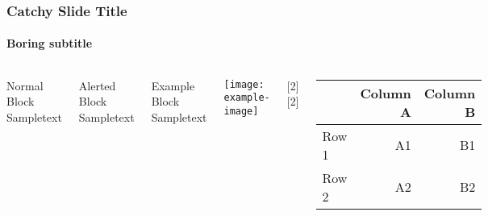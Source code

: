\documentclass[10pt,compress,
               xcolor={dvipsnames,table},
               hyperref={breaklinks}
              ]{beamer}
\begin{document}
\begin{frame}[t]
\frametitle{Catchy Slide Title}
\framesubtitle{Boring subtitle}
\begin{columns}[T]
    \begin{block}{Normal Block}
      Sampletext
    \end{block}
    \vspace{1ex}
    \begin{alertblock}{Alerted Block}
      Sampletext
    \end{alertblock}
    \vspace{1ex}
    \begin{exampleblock}{Example Block}
      Sampletext
    \end{exampleblock}
    \vspace{1ex}
    \texttt{[image: example-image]}
    
    [2]
    \vspace{1ex}
    [2]
    \vspace{1ex}
      \begin{tiny}
        \begin{tabular}{lrr}
          \toprule
                 & Column A & Column B \\
          \midrule
          Row 1  & A1       & B1       \\
          Row 2  & A2       & B2       \\
          \bottomrule
        \end{tabular}
      \end{tiny}
\end{columns}
\end{frame}
\end{document}
